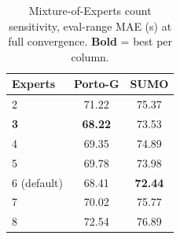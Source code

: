 \documentclass[pdflatex,sn-basic,Numbered]{sn-jnl}%
\begin{document}
\begin{table}[t]
    \centering
    \caption{Mixture-of-Experts count sensitivity, eval-range MAE (s) at full convergence. \textbf{Bold} = best per column.}\label{tab:moe-expert-sweep}
    \begin{tabular}{@{}lcc@{}}
        \toprule
        \textbf{Experts} & Porto-G & SUMO \\
        \midrule
        2           & 71.22          & 75.37          \\
        \textbf{3}  & \textbf{68.22} & 73.53          \\
        4           & 69.35          & 74.89          \\
        5           & 69.78          & 73.98          \\
        6 (default) & 68.41          & \textbf{72.44} \\
        7           & 70.02          & 75.77          \\
        8           & 72.54          & 76.89          \\
        \bottomrule
    \end{tabular}
\end{table}
\end{document}
